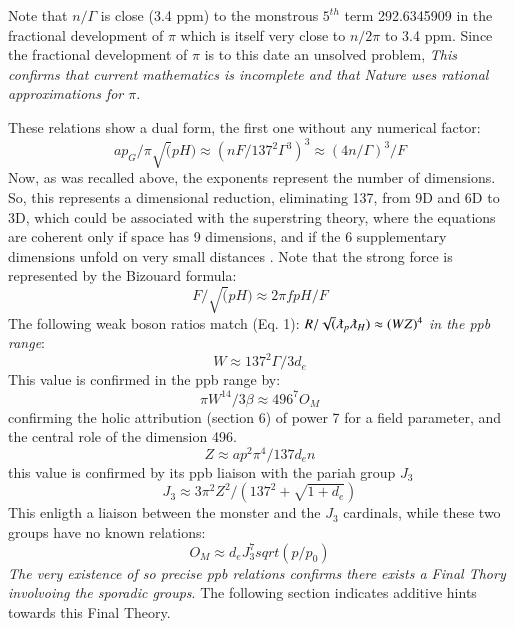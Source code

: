 \documentclass[twoside,draft]{article}
\begin{document}
\begin{sloppypar}
Note that $n/\Gamma$ is close (3.4 ppm) to the monstrous $5^{th}$ term 292.6345909 in
the fractional development of $\pi$ which is itself very close to $n/2\pi$ to 3.4 ppm. Since the fractional
development of $\pi$ is to this date an unsolved problem, \textit{This confirms that current mathematics is
incomplete and that Nature uses rational approximations for $\pi$}.

These relations show a dual form, the first one without any numerical factor:
\begin{equation}
ap_{G} / \pi \sqrt(pH) \approx (n F/137^{2} \Gamma^{3} )^{3} \approx (4n/ \Gamma)^{3}/F
\end{equation}
Now, as was recalled above, the exponents represent the number of
dimensions. So, this represents a dimensional reduction, eliminating 137, from 9D and 6D to
3D, which could be associated with the superstring theory, where the equations are coherent only if space
has 9 dimensions, and if the 6 supplementary dimensions unfold on very small distances \cite{Polchinski}.
Note that the strong force is represented by the Bizouard formula:
\begin{equation}
F/\sqrt(pH) \approx 2\pi fpH/F
\end{equation}
The following weak boson ratios match (Eq. 1):
$R/\sqrt(\lambdabar_{p} \lambdabar_{H} ) \approx (WZ)^{4}$
\textit{in the ppb range}: 
\begin{equation}
W \approx 137^{2} \Gamma / 3d_{e}
\end{equation}
This value is confirmed in the ppb range by:
\begin{equation}
\pi W^{14}/3 \beta \approx 496^7 O_M
\end{equation}
confirming the holic attribution (section 6) of power 7 for a field parameter, and the central role of the dimension 496.
\begin{equation}
Z \approx ap^{2} \pi^{4} / 137 d_{e} n
\end{equation}
this value is confirmed by its ppb liaison with the pariah group $J_3$
\begin{equation}
J_3 \approx 3\pi^2 Z^2 / (137^2 + \sqrt{1+d_e})
\end{equation}
This enligth a liaison between the monster and the $J_3$ cardinals, while these two groups have no known relations:
\begin{equation}
O_M \approx d_e J_3^7 sqrt(p/p_0)
\end{equation}
\textit{The very existence of so precise ppb relations confirms there exists a Final Thory involvoing the sporadic groups}. The following section indicates additive hints towards this Final Theory.



\end{sloppypar}
\end{document}
